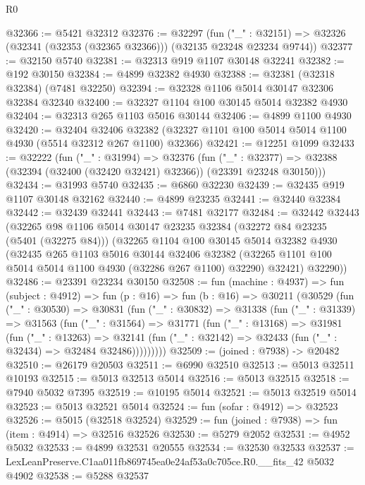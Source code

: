 \begin{lexlean}{R0}
\begin{coremodule}
@32366 := @5421 @32312
@32376 := @32297
    (fun ("_" : @32151) => @32326 (@32341 (@32353 (@32365 @32366))) (@32135 @23248 @23234 @9744))
@32377 := @32150 @5740
@32381 := @32313 @919 @1107 @30148 @32241
@32382 := @192 @30150
@32384 := @4899 @32382 @4930
@32388 := @32381 (@32318 @32384) (@7481 @32250)
@32394 := @32328 @1106 @5014 @30147 @32306 @32384 @32340
@32400 := @32327 @1104 @100 @30145 @5014 @32382 @4930
@32404 := @32313 @265 @1103 @5016 @30144
@32406 := @4899 @1100 @4930
@32420 := @32404
    @32406
    @32382
    (@32327 @1101 @100 @5014 @5014 @1100 @4930 (@5514 @32312 @267 @1100) @32366)
@32421 := @12251 @1099
@32433 := @32222
    (fun ("_" : @31994) =>
    @32376
      (fun ("_" : @32377) =>
      @32388 (@32394 (@32400 (@32420 @32421) @32366)) (@23391 @23248 @30150)))
@32434 := @31993 @5740
@32435 := @6860 @32230
@32439 := @32435 @919 @1107 @30148 @32162
@32440 := @4899 @23235
@32441 := @32440 @32384
@32442 := @32439 @32441
@32443 := @7481 @32177
@32484 := @32442
    @32443
    (@32265
      @98
      @1106
      @5014
      @30147
      @23235
      @32384
      (@32272 @84 @23235 (@5401 (@32275 @84)))
      (@32265
        @1104
        @100
        @30145
        @5014
        @32382
        @4930
        (@32435
          @265
          @1103
          @5016
          @30144
          @32406
          @32382
          (@32265 @1101 @100 @5014 @5014 @1100 @4930 (@32286 @267 @1100) @32290)
          @32421)
        @32290))
@32486 := @23391 @23234 @30150
@32508 := fun (machine : @4937) =>
  fun (subject : @4912) =>
  fun (p : @16) =>
  fun (b : @16) =>
  @30211
    (@30529
      (fun ("_" : @30530) =>
      @30831
        (fun ("_" : @30832) =>
        @31338
          (fun ("_" : @31339) =>
          @31563
            (fun ("_" : @31564) =>
            @31771
              (fun ("_" : @13168) =>
              @31981
                (fun ("_" : @13263) =>
                @32141 (fun ("_" : @32142) => @32433 (fun ("_" : @32434) => @32484 @32486)))))))))
@32509 := (joined : @7938) -> @20482
@32510 := @26179 @20503
@32511 := @6990 @32510
@32513 := @5013 @32511 @10193
@32515 := @5013 @32513 @5014
@32516 := @5013 @32515
@32518 := @7940 @5032 @7395
@32519 := @10195 @5014
@32521 := @5013 @32519 @5014
@32523 := @5013 @32521 @5014
@32524 := fun (sofar : @4912) => @32523
@32526 := @5015 (@32518 @32524)
@32529 := fun (joined : @7938) => fun (item : @4914) => @32516 @32526
@32530 := @5279 @2052
@32531 := @4952 @5032
@32533 := @4899 @32531 @20555
@32534 := @32530 @32533
@32537 := LexLeanPreserve.C1aa011fb869745ea0e24af53a0c705ce.R0.__fits_42 @5032 @4902
@32538 := @5288 @32537

\end{coremodule}
\end{lexlean}
